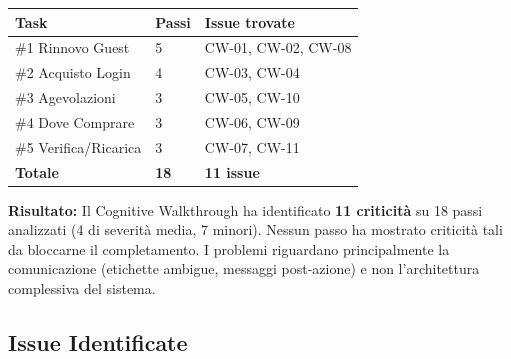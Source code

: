 \documentclass[11pt,a4paper]{article}
\begin{document}
\begin{tcolorbox}[colback=backgroundColor,colframe=primaryColor,arc=2mm]
\small

\renewcommand{\arraystretch}{1.3}
\begin{tabular}{|L{3.5cm}|C{1.5cm}|C{3cm}|}
\hline
\textbf{Task} & \textbf{Passi} & \textbf{Issue trovate} \\
\hline
\#1 Rinnovo Guest & 5 & CW-01, CW-02, CW-08 \\
\hline
\#2 Acquisto Login & 4 & CW-03, CW-04 \\
\hline
\#3 Agevolazioni & 3 & CW-05, CW-10 \\
\hline
\#4 Dove Comprare & 3 & CW-06, CW-09 \\
\hline
\#5 Verifica/Ricarica & 3 & CW-07, CW-11 \\
\hline
{}
\textbf{Totale} & \textbf{18} & \textbf{11 issue} \\
\hline
\end{tabular}

\vspace{0.3cm}
\noindent\textbf{Risultato:} Il Cognitive Walkthrough ha identificato \textbf{11 criticit\`a} su 18 passi analizzati (4 di severit\`a media, 7 minori). Nessun passo ha mostrato criticit\`a tali da bloccarne il completamento. I problemi riguardano principalmente la comunicazione (etichette ambigue, messaggi post-azione) e non l'architettura complessiva del sistema.

\end{tcolorbox}

\vspace{0.3cm}

\subsection{Issue Identificate}
\end{document}

